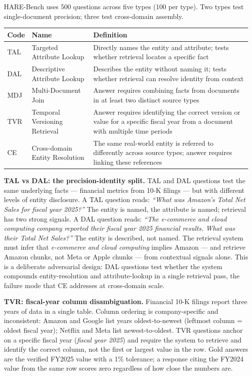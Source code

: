 HARE-Bench uses 500 questions across five types (100 per type). Two types test single-document precision; three test cross-domain assembly.

\begin{small}
\setlength{\tabcolsep}{4pt}
\begin{longtable}{p{0.5in}p{1.2in}p{4.5in}}
\toprule
\textbf{Code} & \textbf{Name} & \textbf{Definition} \\
\midrule
\endhead
TAL & Targeted Attribute Lookup & Directly names the entity and attribute; tests whether retrieval locates a specific fact \\
DAL & Descriptive Attribute Lookup & Describes the entity without naming it; tests whether retrieval can resolve identity from context \\
MDJ & Multi-Document Join & Answer requires combining facts from documents in at least two distinct source types \\
TVR & Temporal Versioning Retrieval & Answer requires identifying the correct version or value for a specific fiscal year from a document with multiple time periods \\
CE & Cross-domain Entity Resolution & The same real-world entity is referred to differently across source types; answer requires linking these references \\
\bottomrule
\end{longtable}
\end{small}

\textbf{TAL vs DAL: the precision-identity split.} TAL and DAL questions test the same underlying facts --- financial metrics from 10-K filings --- but with different levels of entity disclosure. A TAL question reads: \emph{``What was Amazon's Total Net Sales for fiscal year 2025?''} The entity is named, the attribute is named; retrieval has two strong signals. A DAL question reads: \emph{``The e-commerce and cloud computing company reported their fiscal year 2025 financial results. What was their Total Net Sales?''} The entity is described, not named. The retrieval system must infer that \emph{e-commerce and cloud computing} implies Amazon --- and retrieve Amazon chunks, not Meta or Apple chunks --- from contextual signals alone. This is a deliberate adversarial design: DAL questions test whether the system compounds entity-resolution and attribute-lookup in a single retrieval pass, the failure mode that CE addresses at cross-domain scale.

\textbf{TVR: fiscal-year column disambiguation.} Financial 10-K filings report three years of data in a single table. Column ordering is company-specific and inconsistent: Amazon and Google list years oldest-to-newest (leftmost column = oldest fiscal year); Netflix and Meta list newest-to-oldest. TVR questions anchor on a specific fiscal year (\emph{fiscal year 2025}) and require the system to retrieve and identify the correct column, not the first or largest value in the row. Gold answers are the verified FY2025 value with a 1\% tolerance; a response citing the FY2024 value from the same row scores zero regardless of how close the numbers are.

